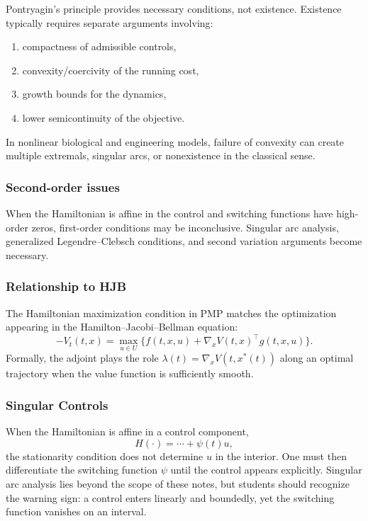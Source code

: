 \documentclass[11pt]{article}
\theoremstyle{definition}
\begin{document}
Pontryagin’s principle provides necessary conditions, not existence. Existence typically requires separate arguments involving:
\begin{enumerate}[label=(\roman*)]
    \item compactness of admissible controls,
    \item convexity/coercivity of the running cost,
    \item growth bounds for the dynamics,
    \item lower semicontinuity of the objective.
\end{enumerate}
In nonlinear biological and engineering models, failure of convexity can create multiple extremals, singular arcs, or nonexistence in the classical sense.

\subsubsection{Second-order issues}
When the Hamiltonian is affine in the control and switching functions have high-order zeros, first-order conditions may be inconclusive. Singular arc analysis, generalized Legendre--Clebsch conditions, and second variation arguments become necessary.

\subsubsection{Relationship to HJB}
The Hamiltonian maximization condition in PMP matches the optimization appearing in the Hamilton--Jacobi--Bellman equation:
\[
-V_t(t,x)=\max_{u\in U}\big\{f(t,x,u)+\nabla_x V(t,x)^\top g(t,x,u)\big\}.
\]
Formally, the adjoint plays the role $\lambda(t)=\nabla_x V(t,x^*(t))$ along an optimal trajectory when the value function is sufficiently smooth.

\subsubsection{Singular Controls}

When the Hamiltonian is affine in a control component,
\[
H(\cdot)=\cdots + \psi(t)u,
\]
the stationarity condition does not determine $u$ in the interior. One must then differentiate the switching function $\psi$ until the control appears explicitly. Singular arc analysis lies beyond the scope of these notes, but students should recognize the warning sign: a control enters linearly and boundedly, yet the switching function vanishes on an interval.
\end{document}
